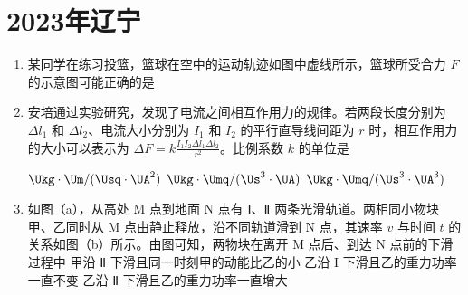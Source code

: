 \documentclass[\gkver]{gaokaozhenti}
\begin{document}
\chapter{2023年辽宁}

\begin{enumerate}
\item
某同学在练习投篮，篮球在空中的运动轨迹如图中虚线所示，篮球所受合力 $F$ 的示意图可能正确的是


\onepicture[w=13.00cm]{}

\item
安培通过实验研究，发现了电流之间相互作用力的规律。若两段长度分别为 $\Delta l_{1}$ 和 $\Delta l_{2}$、电流大小分别为 $I_{1}$ 和 $I_{2}$ 的平行直导线间距为 $r$ 时，相互作用力的大小可以表示为 $\Delta F = k \frac{{{I_1}{I_2}\Delta {l_1}\Delta {l_2}}}{{{r^2}}}$。比例系数 $k$ 的单位是

\fourchoices[answer=B]
{$\Ukg\cdot\Um/(\Usq\cdot\UA)$}
{$\Ukg\cdot\Um/(\Usq\cdot\UA^{2})$}
{$\Ukg\cdot\Umq/(\Us^{3}\cdot\UA)$}
{$\Ukg\cdot\Umq/(\Us^{3}\cdot\UA^{3})$}

\item
如图（a），从高处 M 点到地面 N 点有 Ⅰ、Ⅱ 两条光滑轨道。两相同小物块甲、乙同时从 M 点由静止释放，沿不同轨道滑到 N 点，其速率 $v$ 与时间 $t$ 的关系如图（b）所示。由图可知，两物块在离开 M 点后、到达 N 点前的下滑过程中
{甲沿 Ⅱ 下滑且同一时刻甲的动能比乙的小}
{乙沿 I 下滑且乙的重力功率一直不变}
{乙沿 Ⅱ 下滑且乙的重力功率一直增大}
\end{enumerate}
\end{document}
